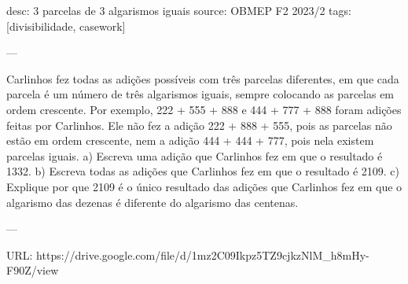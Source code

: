 desc:  $3$ parcelas de $3$ algarismos iguais
source:  OBMEP F2 2023/2
tags:  [divisibilidade, casework]

---

Carlinhos fez todas as adições possíveis com três parcelas diferentes, em que cada parcela é um número de três algarismos iguais, sempre colocando as parcelas em ordem crescente. Por exemplo, 222 + 555 + 888 e 444 + 777 + 888 foram adições feitas por Carlinhos. Ele não fez a adição 222 + 888 + 555, pois as parcelas não estão em ordem crescente, nem a adição 444 + 444 + 777, pois nela existem parcelas iguais.
a) Escreva uma adição que Carlinhos fez em que o resultado é 1332.
b) Escreva todas as adições que Carlinhos fez em que o resultado é 2109.
c) Explique por que 2109 é o único resultado das adições que Carlinhos fez em que o algarismo das dezenas é diferente do algarismo das centenas.

---

URL: https://drive.google.com/file/d/1mz2C09Ikpz5TZ9cjkzNlM_h8mHy-F90Z/view
